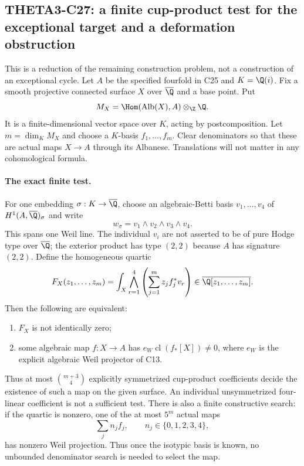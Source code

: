 \subsection{THETA3-C27: a finite cup-product test for the exceptional target and a deformation obstruction}\label{C27}

This is a reduction of the remaining construction problem,
not a construction of an exceptional cycle.  Let $A$ be the
specified fourfold in C25 and $K=\Q(i)$.  Fix a smooth
projective connected surface $X$ over $\overline\Q$ and a
base point.  Put
\[
 M_X=\Hom(\operatorname{Alb}(X),A)\otimes_\Z\Q.
\]
It is a finite-dimensional vector space over $K$, acting
by postcomposition.  Let $m=\dim_K M_X$ and choose a
$K$-basis $f_1,\ldots,f_m$.  Clear denominators so that
these are actual maps $X\to A$ through its Albanese.
Translations will not matter in any cohomological formula.

\paragraph{The exact finite test.}
For one embedding $\sigma:K\to\overline\Q$, choose an
algebraic-Betti basis $v_1,\ldots,v_4$ of
$H^1(A,\overline\Q)_\sigma$ and write
\[
 w_\sigma=v_1\wedge v_2\wedge v_3\wedge v_4.
\]
This spans one Weil line.  The individual $v_i$ are not
asserted to be of pure Hodge type over $\overline\Q$;
the exterior product has type $(2,2)$ because $A$ has
signature $(2,2)$.
Define the homogeneous quartic
\begin{equation}\label{C27-quartic}
 F_X(z_1,\ldots,z_m)
   =\int_X\bigwedge_{r=1}^4
                 \left(\sum_{j=1}^m z_j f_j^*v_r\right)
             \in\overline\Q[z_1,\ldots,z_m].
\end{equation}
Then the following are equivalent:
\begin{enumerate}
\item $F_X$ is not identically zero;
\item some algebraic map $f:X\to A$ has
      $e_W\operatorname{cl}(f_*[X])\ne0$, where $e_W$
      is the explicit algebraic Weil projector of C13.
\end{enumerate}
Thus at most $\binom{m+3}{4}$ explicitly symmetrized
cup-product coefficients decide the existence of such
a map on the given surface.  An individual unsymmetrized
four-linear coefficient is not a sufficient test.
There is also a finite constructive search: if the
quartic is nonzero, one of the at most $5^m$ actual maps
\[
                \sum_j n_jf_j,\qquad
                      n_j\in\{0,1,2,3,4\},
\]
has nonzero Weil projection.  Thus once the isotypic
basis is known, no unbounded denominator search is
needed to select the map.

